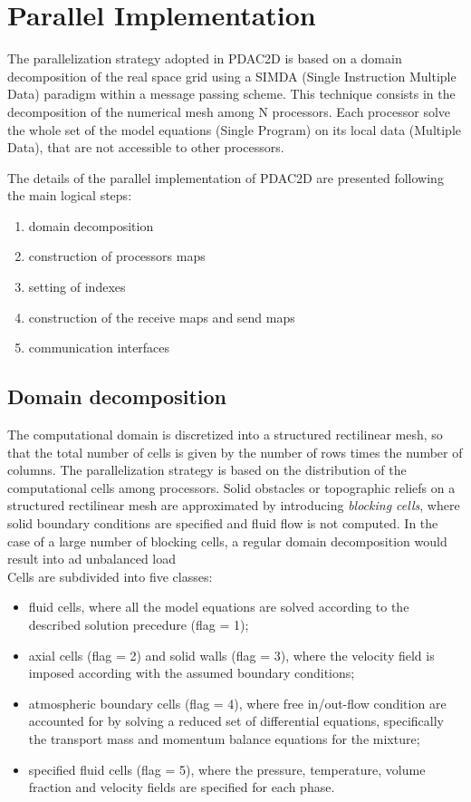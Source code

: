 \section{Parallel Implementation}
%
The parallelization strategy adopted in PDAC2D is based on a domain decomposition
of the real space grid using a SIMDA (Single Instruction Multiple Data) paradigm
within a message passing scheme. This technique consists in the decomposition
of the numerical mesh among N processors. Each processor solve the whole set of
the model equations (Single Program) on its local data (Multiple Data),
that are not accessible to other processors.

%
The details of the parallel implementation of PDAC2D are
presented following the main logical steps:
\begin{enumerate}
\item domain decomposition
\item construction of processors maps
\item setting of indexes
\item construction of the receive maps and send maps
\item communication interfaces
\end{enumerate}
% 
\subsection{Domain decomposition}
The computational domain
is discretized into a structured rectilinear mesh, so that the total number
of cells is given by the number of rows times the number of columns.
The parallelization strategy is based on the distribution of the 
computational cells among processors.
Solid obstacles or topographic reliefs on a structured rectilinear mesh are 
approximated by introducing {\em blocking cells}, where solid boundary 
conditions are specified and fluid flow is not computed.
In the case of a large number of blocking cells, a regular domain decomposition
would result into ad unbalanced load\\
\newpage
Cells are subdivided into five classes:
\begin{itemize}
\item fluid cells, where all the model equations are solved according to the described solution precedure (flag = 1);
\item axial cells (flag = 2) and solid walls (flag = 3), where the velocity 
field is imposed according with the assumed boundary conditions; 
\item atmospheric boundary cells (flag = 4), where free in/out-flow 
condition are accounted for by solving a reduced set of differential 
equations, specifically the transport mass and momentum balance equations 
for the mixture;
\item specified fluid cells (flag = 5), where the pressure, temperature, 
volume fraction and velocity fields are specified for each phase.
\end{itemize}

